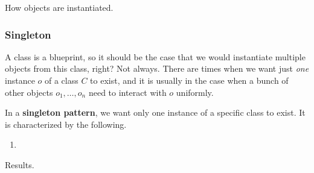   How objects are instantiated. 

  \subsubsection{Singleton} 

    A class is a blueprint, so it should be the case that we would instantiate multiple objects from this class, right? Not always. There are times when we want just \textit{one} instance $o$ of a class $C$ to exist, and it is usually in the case when a bunch of other objects $o_1, \ldots, o_n$ need to interact with $o$ uniformly. 

    \begin{definition}[Singleton]
      \label{def:singleton}
      In a \textbf{singleton pattern}, we want only one instance of a specific class to exist. It is characterized by the following. 
      \begin{enumerate}
        \item 
      \end{enumerate}
    \end{definition}

    Results. 


